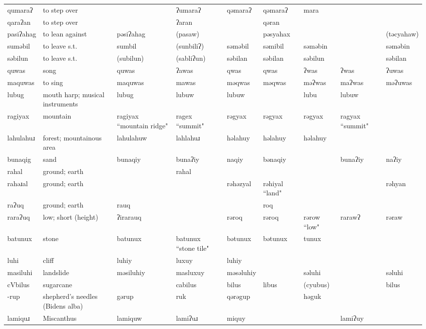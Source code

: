 \begin{landscape}
\begin{longtable}{*{9}{p{}}}
\text{*}qumaraʔ & to step over &  & ʔumaraʔ & qəmaraʔ & qəmaraʔ & mara &  & \\
\text{*}qaraʔan & to step over &  & ʔaran &  & qəran &  &  & \\
\text{*}pasiʔahag & to lean against & pəsiʔahag & (pasaw) &  & pəsyahax &  &  & (təcyahaw)\\
\text{*}suməbil & to leave s.t. & sumbil & (sunbiliʔ) & səməbil & səmibil & səməbin &  & səməbin\\
\text{*}səbilun & to leave s.t. & (subilun) & (sabliʔun) & səbilan & səbilan & səbilun &  & səbilan\\
\text{*}quwas & song & quwas & ʔawas & qwas & qwas & ʔwas & ʔwas & ʔuwas\\
\text{*}maquwas & to sing & maquwas & mawas & məqwas & məqwas & məʔwas & maʔwas & məʔuwas\\
\text{*}lubug & mouth harp; musical instruments & lubug & lubuw & lubuw &  & lubu & lubuw & \\
\text{*}ragiyax & mountain & ragiyax ``mountain ridge" & ragex ``summit" & rəgyax & rəgyax & rəgyax & ragyax ``summit" & \\
\text{*}lahulahuɹ & forest; mountainous area & lahulahuw & lahlahuɹ & həlahuy & həlahuy & həlahuy &  & \\
\text{*}bunaqig & sand & bunaqiy & bunaʔiy & naqiy & bənaqiy &  & bunaʔiy & naʔiy\\
\text{*}rahal & ground; earth &  & rahal &  &  &  &  & \\
\text{*}rahəɹal & ground; earth &  &  & rəhəzyal & rəhiyal ``land" &  &  & rəhyan\\
\text{*}raʔuq & ground; earth & rauq &  &  & roq &  &  & \\
\text{*}raraʔuq & low; short (height) & ʔirarauq &  & rəroq & rəroq & rərow ``low" & rarawʔ & rəraw\\
\text{*}batunux & stone & batunux & batunux ``stone tile" & bətunux & bətunux & tunux &  & \\
\text{*}luhi & cliff & luhiy & luxuy & luhiy &  &  &  & \\
\text{*}masiluhi & landslide & məsiluhiy & masluxuy & məsəluhiy &  & səluhi &  & səluhi\\
\text{*}cVbilus & sugarcane &  & cabilus & bilus & libus & (cyubus) &  & bilus\\
\text{*}-rup & shepherd's needles (Bidens alba) & gərup & ruk & qərəgup &  & həguk &  & \\
\text{*}lamiquɹ & Miscanthus & lamiquw & lamiʔuɹ & miquy &  &  & lamiʔuy & \\

\end{longtable}
\end{landscape}
